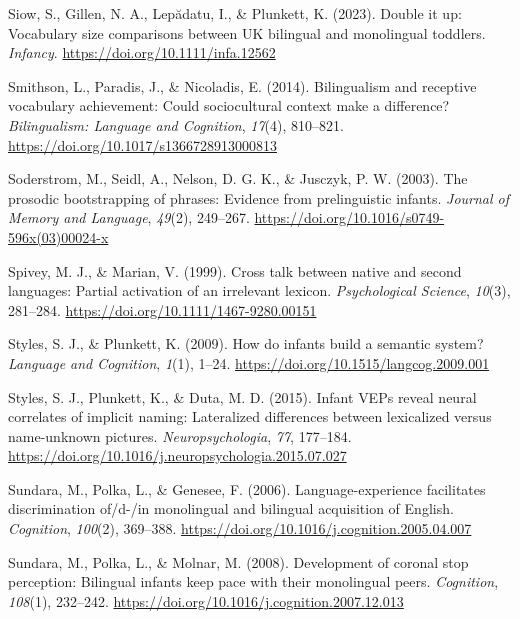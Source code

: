 \documentclass[
  12pt,
  b5paperpaper,
  twoside]{scrreprt}
\newlength{\cslhangindent}
\newlength{\cslentryspacingunit} %
\newenvironment{CSLReferences}[2] %
 {%
  \setlength{\parindent}{0pt}
  \ifodd #1
  \let\oldpar\par
  \def\par{\hangindent=\cslhangindent\oldpar}
  \fi
  \setlength{\parskip}{#2\cslentryspacingunit}
 }%
 {}
\begin{document}
\begin{CSLReferences}{1}{0}
\leavevmode{}%
Siow, S., Gillen, N. A., Lepădatu, I., \& Plunkett, K. (2023). Double it
up: Vocabulary size comparisons between {UK} bilingual and monolingual
toddlers. \emph{Infancy}. \url{https://doi.org/10.1111/infa.12562}

\leavevmode{}%
Smithson, L., Paradis, J., \& Nicoladis, E. (2014). Bilingualism and
receptive vocabulary achievement: Could sociocultural context make a
difference? \emph{Bilingualism: Language and Cognition}, \emph{17}(4),
810--821. \url{https://doi.org/10.1017/s1366728913000813}

\leavevmode{}%
Soderstrom, M., Seidl, A., Nelson, D. G. K., \& Jusczyk, P. W. (2003).
The prosodic bootstrapping of phrases: Evidence from prelinguistic
infants. \emph{Journal of Memory and Language}, \emph{49}(2), 249--267.
\url{https://doi.org/10.1016/s0749-596x(03)00024-x}

\leavevmode{}%
Spivey, M. J., \& Marian, V. (1999). Cross talk between native and
second languages: Partial activation of an irrelevant lexicon.
\emph{Psychological Science}, \emph{10}(3), 281--284.
\url{https://doi.org/10.1111/1467-9280.00151}

\leavevmode{}%
Styles, S. J., \& Plunkett, K. (2009). How do infants build a semantic
system? \emph{Language and Cognition}, \emph{1}(1), 1--24.
\url{https://doi.org/10.1515/langcog.2009.001}

\leavevmode{}%
Styles, S. J., Plunkett, K., \& Duta, M. D. (2015). Infant {VEPs} reveal
neural correlates of implicit naming: Lateralized differences between
lexicalized versus name-unknown pictures. \emph{Neuropsychologia},
\emph{77}, 177--184.
\url{https://doi.org/10.1016/j.neuropsychologia.2015.07.027}

\leavevmode{}%
Sundara, M., Polka, L., \& Genesee, F. (2006). Language-experience
facilitates discrimination of/d-/in monolingual and bilingual
acquisition of {English}. \emph{Cognition}, \emph{100}(2), 369--388.
\url{https://doi.org/10.1016/j.cognition.2005.04.007}

\leavevmode{}%
Sundara, M., Polka, L., \& Molnar, M. (2008). Development of coronal
stop perception: Bilingual infants keep pace with their monolingual
peers. \emph{Cognition}, \emph{108}(1), 232--242.
\url{https://doi.org/10.1016/j.cognition.2007.12.013}


\end{CSLReferences}
\end{document}
